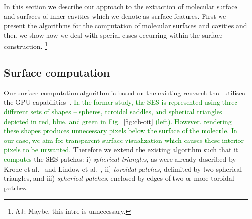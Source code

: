 In this section we describe our approach to the extraction of molecular surface and surfaces of inner cavities which we denote as surface features.
First we present the algorithms for the computation of molecular surfaces and cavities and then we show how we deal with special cases occurring within the surface construction.
\footnote{AJ: Maybe, this intro is unnecessary.}

\subsection{Surface computation}
\label{sec:ecb}
Our surface computation algorithm is based on the existing research that utilizes the GPU capabilities~\cite{krone2011parallel}.
\textcolor{green}{In the former study, the SES is represented using three different sets of shapes -- spheres, toroidal saddles, and spherical triangles depicted in red, blue, and green in Fig.~\ref{fig:cb-oit} (left).}
\textcolor{green}{However, rendering these shapes produces unnecessary pixels below the surface of the molecule.
In our case, we aim for transparent surface visualization which causes these interior pixels to be unwanted.}
Therefore we extend the existing algorithm such that it \textcolor{green}{computes}
the SES patches:
i) \textit{spherical triangles}, as were already described by Krone et al.~\cite{krone2011parallel} and Lindow et al.~\cite{lindow2010accelerated},
ii) \textit{toroidal patches}, delimited by two spherical triangles, and
iii) \textit{spherical patches}, enclosed by edges of two or more toroidal patches.

